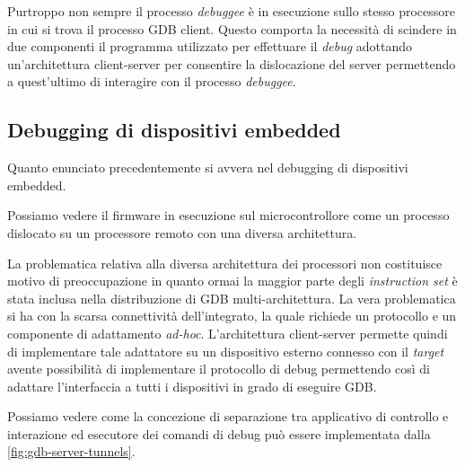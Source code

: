 Purtroppo non sempre il processo \textit{debuggee} è in esecuzione sullo stesso processore in cui si trova il processo GDB client. Questo comporta la necessità di scindere in due componenti il programma utilizzato per effettuare il \textit{debug} adottando un'architettura client-server per consentire la dislocazione del server permettendo a quest'ultimo di interagire con il processo \textit{debuggee}.

\subsection{Debugging di dispositivi embedded}

Quanto enunciato precedentemente si avvera nel debugging di dispositivi embedded. 

Possiamo vedere il firmware in esecuzione sul microcontrollore come un processo dislocato su un processore remoto con una diversa architettura.

La problematica relativa alla diversa architettura dei processori non costituisce motivo di preoccupazione in quanto ormai la maggior parte degli \textit{instruction set} è stata inclusa nella distribuzione di GDB multi-architettura\cite{site:gdb}.
La vera problematica si ha con la scarsa connettività dell'integrato, la quale richiede un protocollo e un componente di adattamento \textit{ad-hoc}.
L'architettura client-server permette quindi di implementare tale adattatore su un dispositivo esterno connesso con il \textit{target} avente possibilità di implementare il protocollo di debug permettendo così di adattare l'interfaccia a tutti i dispositivi in grado di eseguire GDB.\@ 

Possiamo vedere come la concezione di separazione tra applicativo di controllo e interazione ed esecutore dei comandi di debug può essere implementata dalla \cref{fig:gdb-server-tunnels}.

